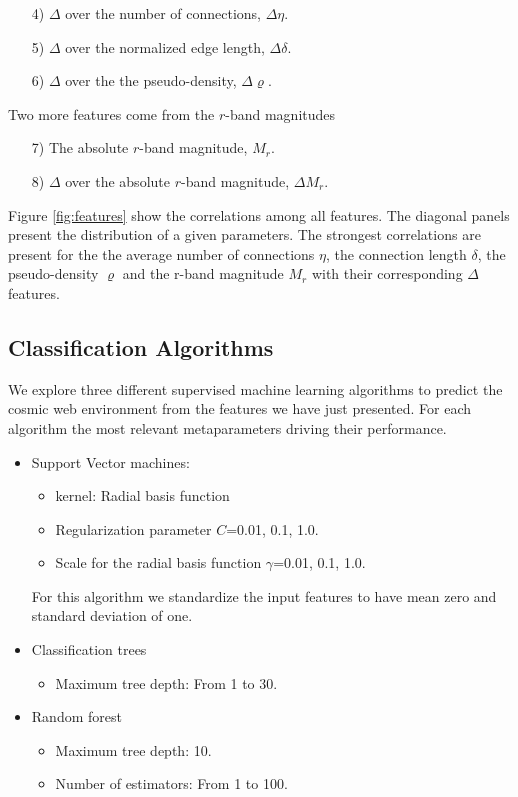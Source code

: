 \documentclass[usenatbib]{mnras}
\begin{document}
\begin{enumerate}
\item[4)] $\Delta$ over the number of connections, $\Delta\eta$.
\item[5)] $\Delta$ over the normalized edge length, $\Delta\delta$.
\item[6)] $\Delta$ over the the pseudo-density, $\Delta\varrho$.
\end{enumerate}

\noindent
Two more features come from the $r$-band magnitudes
\begin{enumerate}
\item[7)] The absolute $r$-band magnitude, $M_r$.
\item[8)] $\Delta$ over the absolute $r$-band magnitude, $\Delta M_r$.
\end{enumerate}

Figure \ref{fig:features} show the correlations among all features.
The diagonal panels present the distribution of a given parameters.
The strongest correlations are present for the the average number of
connections $\eta$, the connection length $\delta$, the
pseudo-density $\varrho$ and the r-band magnitude $M_r$ with their
corresponding $\Delta$ features.





\subsection{Classification Algorithms}

We explore three different supervised machine learning algorithms to
predict the cosmic web environment from the features we have just
presented. 
For each algorithm the most relevant metaparameters driving their
performance.

\begin{itemize}
    \item Support Vector machines: 
        \begin{itemize}
            \item kernel: Radial basis function
            \item Regularization parameter $C$=0.01, 0.1, 1.0.
            \item Scale for the radial basis function  $\gamma$=0.01, 0.1, 1.0.
        \end{itemize}
        For this algorithm we standardize the input features to have
        mean zero and standard deviation of one. 
    \item Classification trees
      \begin{itemize}
      \item Maximum tree depth: From 1 to 30.
      \end{itemize}
    \item Random forest
        \begin{itemize}
            \item Maximum tree depth: 10.
            \item Number of estimators: From 1 to 100.
        \end{itemize}
\end{itemize}
\end{document}
